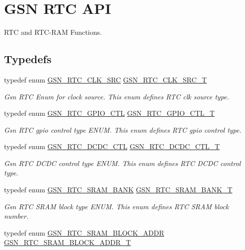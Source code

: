 \hypertarget{a00651}{
\section{GSN RTC API}
\label{a00651}
}


RTC and RTC-\/RAM Functions.  


\subsection*{Typedefs}
\begin{DoxyCompactItemize}
\item 
typedef enum \hyperlink{a00651_gaace509e7754aacb14b76f77e68fa9b2a}{GSN\_\-RTC\_\-CLK\_\-SRC} \hyperlink{a00651_gadb97e494297aadf7b5dda5f239d96c80}{GSN\_\-RTC\_\-CLK\_\-SRC\_\-T}
\begin{DoxyCompactList}\small\item\em Gsn RTC Enum for clock source. This enum defines RTC clk source type. \end{DoxyCompactList}\item 
typedef enum \hyperlink{a00651_ga3481de456997229518bb1895981bfd74}{GSN\_\-RTC\_\-GPIO\_\-CTL} \hyperlink{a00651_gaac2b2cc7a6f64a96caddc19f3b3df78b}{GSN\_\-RTC\_\-GPIO\_\-CTL\_\-T}
\begin{DoxyCompactList}\small\item\em Gsn RTC gpio control type ENUM. This enum defines RTC gpio control type. \end{DoxyCompactList}\item 
typedef enum \hyperlink{a00651_ga9b99af1b9b8d009d88640121a1de2e9d}{GSN\_\-RTC\_\-DCDC\_\-CTL} \hyperlink{a00651_gadac67c4bef428c38b07db46ce0a24d23}{GSN\_\-RTC\_\-DCDC\_\-CTL\_\-T}
\begin{DoxyCompactList}\small\item\em Gsn RTC DCDC control type ENUM. This enum defines RTC DCDC control type. \end{DoxyCompactList}\item 
typedef enum \hyperlink{a00651_ga77c3be59f640309dc97a21e937aa9b3c}{GSN\_\-RTC\_\-SRAM\_\-BANK} \hyperlink{a00651_ga70bc76d00099ffb3dabb49354ff57870}{GSN\_\-RTC\_\-SRAM\_\-BANK\_\-T}
\begin{DoxyCompactList}\small\item\em Gsn RTC SRAM block type ENUM. This enum defines RTC SRAM block number. \end{DoxyCompactList}\item 
typedef enum \hyperlink{a00651_gaec3839be6e64287f1c0981aafc08548b}{GSN\_\-RTC\_\-SRAM\_\-BLOCK\_\-ADDR} \hyperlink{a00651_ga490147beeb60589ba19b9446b63b0ea0}{GSN\_\-RTC\_\-SRAM\_\-BLOCK\_\-ADDR\_\-T}

\end{DoxyCompactItemize}
